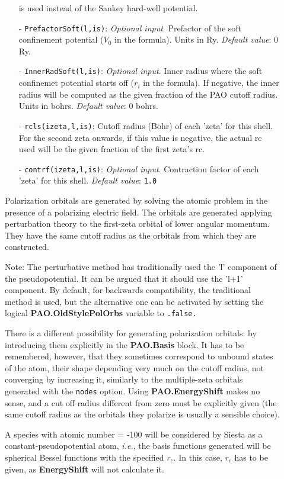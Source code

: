 \documentclass[11pt]{article}
\begin{document}
\begin{description}
\begin{itemize}
is used instead of the Sankey hard-well potential.
\item[-] {\tt PrefactorSoft(l,is)}: {\it Optional input}. Prefactor
of the soft confinement potential ($V_{0}$ in the formula). Units in Ry.
{\it Default value}: 0 Ry.
\item[-] {\tt InnerRadSoft(l,is)}: {\it Optional input}. Inner radius where
the soft confinemet potential starts off ($r_{i}$ in the formula).
If negative, the inner radius will be computed as the given fraction
of the PAO cutoff radius.
Units in bohrs. {\it Default value}: 0 bohrs.
\item[-] {\tt rcls(izeta,l,is)}: Cutoff radius (Bohr) of
each 'zeta' for this shell. For the second zeta onwards, if this value
is negative, the actual rc used will be the given fraction of the
first zeta's rc.
\item[-] {\tt contrf(izeta,l,is)}: {\it Optional input}.
Contraction factor of
each 'zeta' for this shell.
{\it Default value}: {\tt 1.0}
\end{itemize}

Polarization orbitals are generated by solving the
atomic problem in the presence of a polarizing electric field. The
orbitals are generated applying perturbation theory to the first-zeta
orbital of lower angular momentum.  They have the same cutoff radius
as the orbitals from which they are constructed.

Note: The perturbative method has traditionally used the 'l' component
of the pseudopotential. It can be argued that it should use the 'l+1'
component. By default, for backwards compatibility, the traditional
method is used, but the alternative one can be activated by setting
the logical {\bf PAO.OldStylePolOrbs} variable to {\tt .false.}

There is a different possibility for generating polarization orbitals:
by introducing them explicitly in the {\bf PAO.Basis} block.
It has to be remembered, however, that they sometimes correspond to
unbound states of the atom, their shape depending very much on the
cutoff radius, not converging by increasing it, similarly to the
multiple-zeta orbitals generated with the {\tt nodes} option.
Using {\bf PAO.EnergyShift} makes no sense, and a cut off
radius different from zero must be explicitly given (the same cutoff radius
as the orbitals they polarize is usually a sensible choice).

A species with atomic number = -100 will be considered by {\sc Siesta} as
a constant-pseudopotential atom, {\it i.e.}, the basis functions
generated will be spherical Bessel functions
with the specified $r_c$. In this case, $r_c$ has to be given, as
{\bf EnergyShift} will not calculate it.


\end{description}
\end{document}
